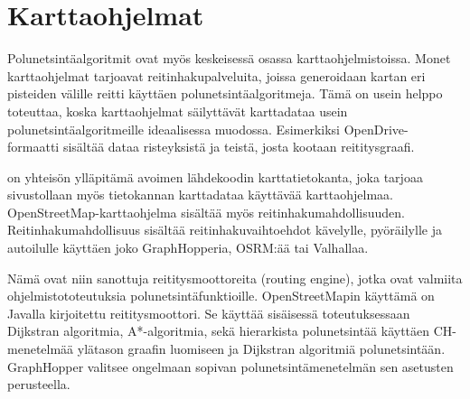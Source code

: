 \section{Karttaohjelmat}\label{karttaohjelmat}
Polunetsintäalgoritmit ovat myös keskeisessä osassa karttaohjelmistoissa. 
Monet karttaohjelmat tarjoavat reitinhakupalveluita, joissa generoidaan kartan  
eri pisteiden välille reitti käyttäen polunetsintäalgoritmeja. Tämä on usein 
helppo toteuttaa, koska karttaohjelmat säilyttävät karttadataa usein 
polunetsintäalgoritmeille ideaalisessa muodossa. Esimerkiksi OpenDrive-
formaatti sisältää dataa risteyksistä ja teistä, josta kootaan 
reititysgraafi.\cite{Lanelet2} \par
	\textcite{OpenStreetMap} on yhteisön ylläpitämä avoimen lähdekoodin 
karttatietokanta, joka tarjoaa sivustollaan myös tietokannan karttadataa 
käyttävää karttaohjelmaa.\cite{OSMAbout} OpenStreetMap-karttaohjelma sisältää 
myös reitinhakumahdollisuuden. Reitinhakumahdollisuus sisältää 
reitinhakuvaihtoehdot kävelylle, pyöräilylle ja autoilulle käyttäen joko 
GraphHopperia, OSRM:ää tai Valhallaa.\cite{OpenStreetMap} \par
	Nämä ovat niin sanottuja reititysmoottoreita (routing engine), jotka 
ovat valmiita ohjelmistototeutuksia polunetsintäfunktioille.\cite{graphhopper} 
OpenStreetMapin käyttämä \textcite{graphhopper} on Javalla kirjoitettu 
reititysmoottori. Se käyttää sisäisessä toteutuksessaan Dijkstran algoritmia, 
A*-algoritmia, sekä hierarkista polunetsintää käyttäen CH-menetelmää ylätason 
graafin luomiseen ja Dijkstran algoritmiä polunetsintään. GraphHopper valitsee 
ongelmaan sopivan polunetsintämenetelmän sen asetusten perusteella.

